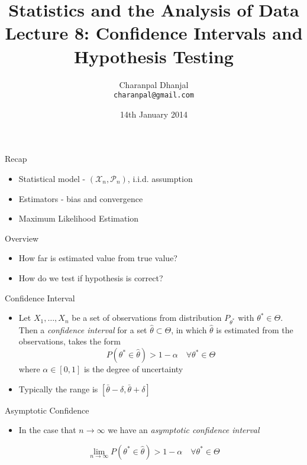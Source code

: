 \documentclass{beamer}
\title{Statistics and the Analysis of Data\\ Lecture 8: Confidence Intervals and Hypothesis Testing}
\author{Charanpal Dhanjal \\ \texttt{charanpal@gmail.com}}
\institute{\'{E}cole des Ponts}
\date{14th January 2014}
\begin{document}
\frame{\titlepage}

\begin{frame}{Recap}  
\begin{itemize} 
 \item Statistical model - $(\mathcal{X}_n, \mathcal{P}_n)$, i.i.d. assumption 
 \item Estimators - bias and convergence 
 \item Maximum Likelihood Estimation 
\end{itemize} 
\end{frame}

\begin{frame}{Overview}
\begin{itemize} 
 \item How far is estimated value from true value? 
\item How do we test if hypothesis is correct? 
\end{itemize}
\end{frame}

\begin{frame}{Confidence Interval} 
\begin{itemize} 
 \item Let $X_1, \ldots, X_n$ be a set of observations from distribution $P_{\theta^*}$ with $\theta^* \in \Theta$. Then a \emph{confidence interval} for a set  $\hat{\theta} \subset \Theta$, in which $\hat{\theta}$ is estimated from the observations, takes the form  
\begin{displaymath} 
 P(\theta^* \in \hat{\theta}) > 1 - \alpha \quad \forall \theta^* \in \Theta 
\end{displaymath}
 where $\alpha \in [0, 1]$ is the degree of uncertainty 
\item Typically the range is $[\bar{\theta} - \delta, \bar{\theta} + \delta]$   
\end{itemize}
\end{frame}

\begin{frame}{Asymptotic Confidence}  
\begin{itemize} 
 \item In the case that $n \rightarrow \infty$ we have an \emph{asymptotic confidence interval} 
\end{itemize}
 \begin{displaymath} 
 \lim_{n \rightarrow \infty} P(\theta^* \in \hat{\theta}) > 1 - \alpha \quad \forall \theta^* \in \Theta 
\end{displaymath}
\end{frame}
\end{document}
